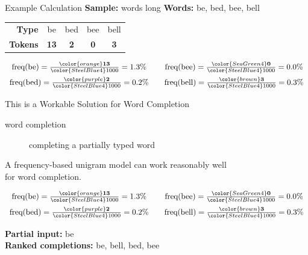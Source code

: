 \documentclass[professionalfonts, xcolor={usenames,svgnames,x11names,table}]{beamer}
\begin{document}
\begin{frame}{Example Calculation}
    \textbf{Sample:}  words long
    \hfill
    \textbf{Words:} be, bed, bee, bell
    \begin{center}
        \begin{tabular}{rcccc}
            \textbf{Type} & be & bed & bee & bell\\
            \textbf{Tokens} & \color{orange}\bfseries 13 & \color{purple}\bfseries 2 & \color{SeaGreen4}\bfseries 0 & \color{brown}\bfseries 3 
        \end{tabular}
    \end{center}
    \[
        \begin{array}{c@{\hspace{2em}}c}
            \text{freq}(\text{be}) = \frac{\color{orange}\mathbf{13}}{\color{SteelBlue4} 1000} = 1.3\%
            &
            \text{freq}(\text{bee}) = \frac{\color{SeaGreen4}\mathbf{0}}{\color{SteelBlue4} 1000} = 0.0\%
            \\[6pt]
            \text{freq}(\text{bed}) = \frac{\color{purple}\mathbf{2}}{\color{SteelBlue4} 1000} = 0.2\%
            &
            \text{freq}(\text{bell}) = \frac{\color{brown}\mathbf{3}}{\color{SteelBlue4} 1000} = 0.3\%\\
        \end{array}
    \]
\end{frame}

\begin{frame}{This is a Workable Solution for Word Completion}
    \begin{description}
        \item[word completion] completing a partially typed word
    \end{description}

    A frequency-based unigram model can work reasonably well\\
    for word completion.

    \begin{example}
    \[
        \begin{array}{c@{\hspace{2em}}c}
            \text{freq}(\text{be}) = \frac{\color{orange}\mathbf{13}}{\color{SteelBlue4} 1000} = 1.3\%
            &
            \text{freq}(\text{bee}) = \frac{\color{SeaGreen4}\mathbf{0}}{\color{SteelBlue4} 1000} = 0.0\%
            \\[6pt]
            \text{freq}(\text{bed}) = \frac{\color{purple}\mathbf{2}}{\color{SteelBlue4} 1000} = 0.2\%
            &
            \text{freq}(\text{bell}) = \frac{\color{brown}\mathbf{3}}{\color{SteelBlue4} 1000} = 0.3\%\\
        \end{array}
    \]

    \medskip
    \textbf{Partial input:} be\\
    \textbf{Ranked completions:} be, bell, bed, bee
    \end{example}
\end{frame}
\end{document}
